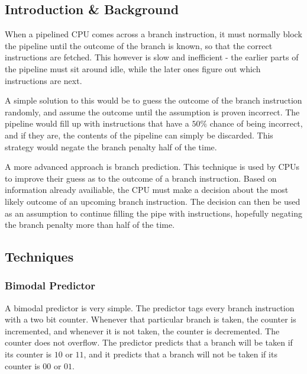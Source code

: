 
\subsection{Introduction \& Background}

When a pipelined CPU comes across a branch instruction, it must normally
block the pipeline until the outcome of the branch is known, so that the
correct instructions are fetched. This however is slow and inefficient -
the earlier parts of the pipeline must sit around idle, while the later
ones figure out which instructions are next.

A simple solution to this would be to guess the outcome of the branch
instruction randomly, and assume the outcome until the assumption is
proven incorrect.
The pipeline would fill up with instructions that have a \(50\%\) chance
of being incorrect, and if they are, the contents of the pipeline
can simply be discarded.
This strategy would negate the branch penalty half of the time.

A more advanced approach is branch prediction.
This technique is used by CPUs to improve their guess as to the outcome of
a branch instruction.
Based on information already availiable, the CPU must make a decision about
the most likely outcome of an upcoming branch instruction. The decision can
then be used as an assumption to continue filling the pipe with instructions,
hopefully negating the branch penalty more than half of the time.

\subsection{Techniques}

\subsubsection{Bimodal Predictor}

A bimodal predictor is very simple.
The predictor tags every branch instruction with a two bit counter.
Whenever that particular branch is taken, the counter is incremented,
and whenever it is not taken, the counter is decremented.
The counter does not overflow.
The predictor predicts that a branch will be taken if its counter
is \(10\) or \(11\), and it predicts that a branch will not be taken
if its counter is \(00\) or \(01\).

